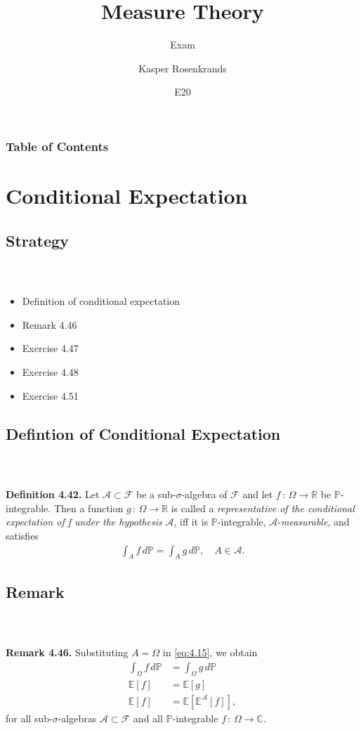 \documentclass{beamer}
\title{Measure Theory}
\subtitle{Exam}
\author{Kasper Rosenkrands}
\institute{Aalborg University}
\date{E20}
\numberwithin{equation}{section}
\newenvironment{frame2}{\begin{frame}\frametitle{{\normalsize \secname} \\ {\large \subsecname}}}{\end{frame}}
\begin{document}
\frame{\titlepage}

\begin{frame}
\frametitle{Table of Contents}
\tableofcontents[hideallsubsections]
\end{frame}

\section{Conditional Expectation}

\subsection{Strategy}
\begin{frame2}
    \begin{itemize}
        \item Definition of conditional expectation
        \item Remark 4.46
        \item Exercise 4.47
        \item Exercise 4.48
        \item Exercise 4.51
    \end{itemize}
\end{frame2}

\subsection{Defintion of Conditional Expectation}

\begin{frame2}
    \textbf{Definition 4.42.}
    Let $\mathcal{A} \subset \mathcal{F}$ be a sub-$\sigma$-algebra of $\mathcal{F}$ and let $f \, : \, \Omega \rightarrow \mathbb{R}$ be $\mathbb{P}$-integrable.
    Then a function $g \, : \, \Omega \rightarrow \mathbb{R}$ is called a \textit{representative of the conditional expectation of f under the hypothesis} $\mathcal{A}$, iff it is $\mathbb{P}$-integrable, $\mathcal{A}$-\textit{measurable}, and satisfies
    \begin{align}\label{eq:4.15}
        \int_Af\, d\mathbb{P} = \int_Ag\, d\mathbb{P}, \quad A \in \mathcal{A}.
    \end{align}
\end{frame2}

\subsection{Remark}

\begin{frame2}
    \textbf{Remark 4.46.}
    Substituting $A = \Omega$ in \eqref{eq:4.15}, we obtain
    \begin{align}
        \int_\Omega f\, d\mathbb{P} &= \int_\Omega g\, d\mathbb{P} \\
        \mathbb{E}[f] &= \mathbb{E}\left[g\right] \\
        \mathbb{E}[f] &= \mathbb{E}\left[\mathbb{E}^\mathcal{A}\left[f\right]\right],
    \end{align}
    for all sub-$\sigma$-algebras $\mathcal{A} \subset \mathcal{F}$ and all $\mathbb{P}$-integrable $f \, : \, \Omega \rightarrow \mathbb{C}$.
\end{frame2}
\end{document}
